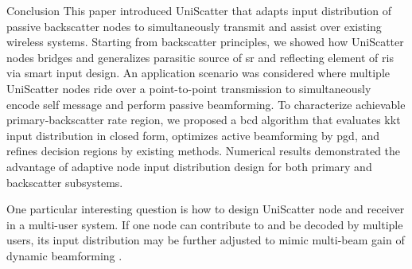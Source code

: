 \documentclass[journal]{IEEEtran}
\begin{document}
\begin{section}{Conclusion}
	This paper introduced UniScatter that adapts input distribution of passive backscatter nodes to simultaneously transmit and assist over existing wireless systems.
	Starting from backscatter principles, we showed how UniScatter nodes bridges and generalizes parasitic source of \gls{sr} and reflecting element of \gls{ris} via smart input design.
	An application scenario was considered where multiple UniScatter nodes ride over a point-to-point transmission to simultaneously encode self message and perform passive beamforming.
	To characterize achievable primary-backscatter rate region, we proposed a \gls{bcd} algorithm that evaluates \gls{kkt} input distribution in closed form, optimizes active beamforming by \gls{pgd}, and refines decision regions by existing methods.
	Numerical results demonstrated the advantage of adaptive node input distribution design for both primary and backscatter subsystems.

	One particular interesting question is how to design UniScatter node and receiver in a multi-user system.
	If one node can contribute to and be decoded by multiple users, its input distribution may be further adjusted to mimic multi-beam gain of dynamic beamforming \cite{Qiu2022}.
\end{section}
\end{document}
